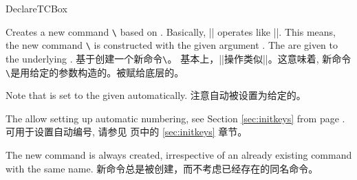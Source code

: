 \begin{docCommand}{DeclareTCBox}{}
\begin{stripedbox}
Creates a new command \texttt{\textbackslash} based on .
Basically, |\DeclareTCBox| operates like |\DeclareDocumentCommand|. This means,
the new command \texttt{\textbackslash} is constructed with the given argument .
The  are given to the underlying .
\tcblower
基于创建一个新命令\texttt{\textbackslash}。%
基本上，|\DeclareTCBox|操作类似|\DeclareDocumentCommand|。这意味着,%
新命令\texttt{\textbackslash}是用给定的参数构造的。被赋给底层的。
\end{stripedbox}


\begin{stripedbox}
Note that  is set to the given 
automatically.
\tcblower
注意自动被设置为给定的。
\end{stripedbox}

\begin{stripedbox}
The  allow setting up automatic numbering,
see Section \ref{sec:initkeys} from page \pageref{sec:initkeys}.
\tcblower
{}可用于设置自动编号,
请参见 \pageref{sec:initkeys} 页中的 \ref{sec:initkeys} 章节。
\end{stripedbox}

\begin{stripedbox}
The new command is always created, irrespective of an already existing
command with the same name.
\tcblower
新命令总是被创建，而不考虑已经存在的同名命令。
\end{stripedbox}
  

\end{docCommand}

